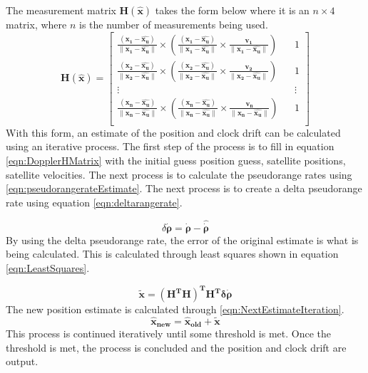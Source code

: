 \documentclass[12pt]{report}
\begin{document}
The measurement matrix $\mathbf{H(\mathbf{\hat{x}})}$ takes the form below where it is an $n \times 4$ matrix, where $n$ is the number of measurements being used.
\begin{equation}
\mathbf{H(\mathbf{\hat{x}})} = \begin{bmatrix}
    \frac{(\mathbf{x_1} - \mathbf{\hat{x_u}})}{\| \mathbf{x_1} - \mathbf{\hat{x_u}}\|} \times \left(\frac{(\mathbf{x_1} - \mathbf{\hat{x_u}})}{\| \mathbf{x_1} - \mathbf{\hat{x_u}}\|} \times \frac{\mathbf{v_1}}{\| \mathbf{x_1} - \mathbf{\hat{x_u}}\|}\right) && 1 \\
    \frac{(\mathbf{x_2} - \mathbf{\hat{x_u}})}{\| \mathbf{x_2} - \mathbf{\hat{x_u}}\|} \times \left(\frac{(\mathbf{x_2} - \mathbf{\hat{x_u}})}{\| \mathbf{x_2} - \mathbf{\hat{x_u}}\|} \times \frac{\mathbf{v_2}}{\| \mathbf{x_2} - \mathbf{\hat{x_u}}\|}\right) && 1 \\
    \vdots && \vdots\\
    \frac{(\mathbf{x_n} - \mathbf{\hat{x_u}})}{\| \mathbf{x_n} - \mathbf{\hat{x_u}}\|} \times \left(\frac{(\mathbf{x_n} - \mathbf{\hat{x_u}})}{\| \mathbf{x_n} - \mathbf{\hat{x_u}}\|} \times \frac{\mathbf{v_n}}{\| \mathbf{x_n} - \mathbf{\hat{x_u}}\|}\right) && 1 \\
\end{bmatrix}
\label{eqn:DopplerHMatrix}
\end{equation}
With this form, an estimate of the position and clock drift can be calculated using an iterative process. The first step of the process is to fill in equation \ref{eqn:DopplerHMatrix} with the initial guess position guess, satellite positions, satellite velocities. The next process is to calculate the pseudorange rates using \ref{eqn:pseudorangerateEstimate}. The next process is to create a delta pseudorange rate using equation \ref{eqn:deltarangerate}.

\begin{equation}
\delta \mathbf{\dot{\rho}} = \mathbf{\dot{\rho}} - \mathbf{\hat{\dot{\rho}}}
\label{eqn:deltarangerate}
\end{equation}
By using the delta pseudorange rate, the error of the original estimate is what is being calculated. This is calculated through least squares shown in equation \ref{eqn:LeastSquares}.

\begin{equation}
\mathbf{\tilde{x}} = \mathbf{(H^TH)^T H^T \delta \dot{\rho}}
    \label{eqn:LeastSquares}
\end{equation}
The new position estimate is calculated through \ref{eqn:NextEstimateIteration}.
\begin{equation}
    \mathbf{\hat{x}_{new}} = \mathbf{\hat{x}_{old}} + \mathbf{\tilde{x}}
\label{eqn:NextEstimateIteration}
\end{equation}
This process is continued iteratively until some threshold is met. Once the threshold is met, the process is concluded and the position and clock drift are output.
\end{document}
